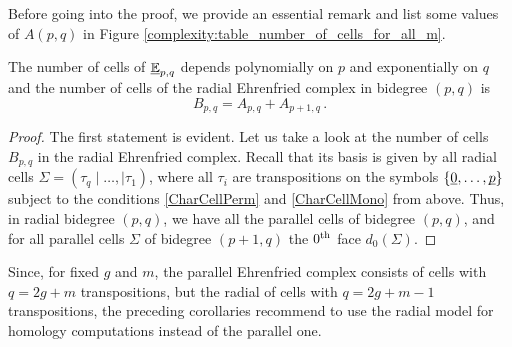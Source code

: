 Before going into the proof, we provide an essential remark and list some values of $A(p,q)$ in Figure \ref{complexity:table_number_of_cells_for_all_m}.
\begin{cor}
    The number of cells of $\underline{\smash{\mathbb E}}_{p, q}$ depends polynomially on $p$ and exponentially on $q$ and the number of cells of the radial Ehrenfried complex in bidegree $(p, q)$ is
    \[
        B_{p, q} = A_{p, q} + A_{p+1, q}\,.
    \]
\end{cor}
\begin{proof}
    The first statement is evident.
    Let us take a look at the number of cells $B_{p, q}$ in the radial Ehrenfried complex.
    Recall that its basis is given by all radial cells $\Sigma = (\tau_q \mid \dotsc, \mid \tau_1)$,
    where all $\tau_i$ are transpositions on the symbols $\{\underline{\smash{0}}, \dotsc, \underline{\smash{p}}\}$ 
    subject to the conditions \eqref{CharCellPerm} and \eqref{CharCellMono} from above.
    Thus, in radial bidegree $(p, q)$, we have all the parallel cells of bidegree $(p, q)$, 
    and for all parallel cells $\Sigma$ of bidegree $(p+1, q)$ the $0^{\text{th}}$ face $d_0(\Sigma)$.
\end{proof}
\begin{rem}
Since, for fixed $g$ and $m$, the parallel Ehrenfried complex consists of cells with $q = 2g + m$ transpositions,
but the radial of cells with $q = 2g + m - 1$ transpositions,
the preceding corollaries recommend to use the radial model for homology computations instead of the parallel one.
\end{rem}

